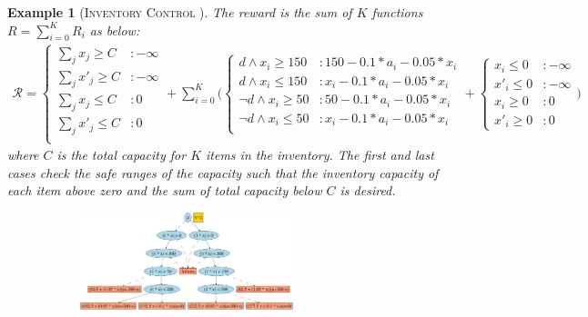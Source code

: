 \documentclass[twoside,11pt]{article}
\newcommand{\InventoryControl}{\textsc{Inventory Control }}
\newtheorem*{example*}{Example}
\begin{document}
\begin{example*} [\InventoryControl]
The reward is the sum of $K$ functions $R = \sum_{i=0}^K R_i $ as below:
{\footnotesize
\begin{align}
\mathcal{R} =
\begin{cases}
\sum_{j} x_j \geq C &: -\infty  \\	
\sum_{j} x'_j \geq C &: -\infty 	\\
\sum_{j} x_j \leq C &:0\\  
\sum_{j} x'_j \leq C &: 0 	\\
\end{cases}
+
\sum_{i=0}^K \Bigg( \begin{cases}
d \wedge x_i \geq 150&: 150 - 0.1 * a_i - 0.05 * x_i \\
d \wedge x_i \leq 150 &:   x_i - 0.1 * a_i - 0.05 * x_i \\
\neg d \wedge x_i \geq 50 &: 50 - 0.1 * a_i - 0.05 * x_i  \\
\neg d \wedge x_i \leq 50 &: x_i - 0.1 * a_i - 0.05 * x_i  \\
\end{cases} 
+ 
\begin{cases}
x_i \leq 0 &: -\infty  \\	
x'_i \leq 0&: -\infty  \\	
x_i \geq 0 &:0\\
x'_i \geq 0 &: 0
\end{cases} \Bigg)
\label{rew_inv}
\end{align}}
where $C$ is the total capacity for $K$ items in the inventory. The first and last cases check the safe ranges of the capacity such that the inventory capacity of each item above zero and the sum of total capacity below $C$ is desired.
\begin{figure}[t!]
\centering
\begin{subfigure}
                \centering
                \includegraphics[width=0.68\textwidth]{pics/inv-v2.pdf}

\end{subfigure}
\end{figure}
\end{example*}
\end{document}
